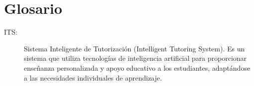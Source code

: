 \section*{Glosario}

\begin{description}
    \item[ITS:] Sistema Inteligente de Tutorización (Intelligent Tutoring System). Es un sistema que utiliza tecnologías de inteligencia artificial para proporcionar enseñanza personalizada y apoyo educativo a los estudiantes, adaptándose a las necesidades individuales de aprendizaje.
\end{description}

